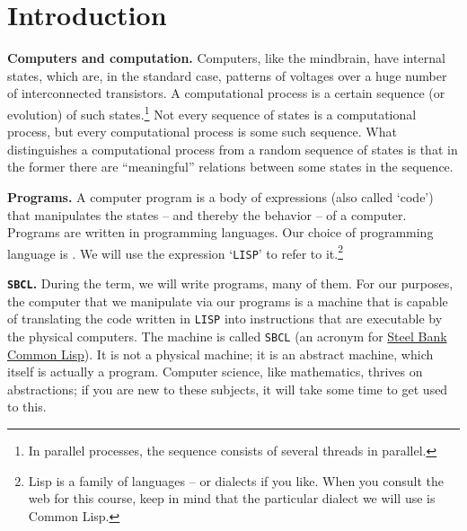 \documentclass[a4paper,11pt]{article}
\begin{document}

\section{Introduction}

\begin{uenum}
\item
{\bf Computers and computation.}
 Computers, like the mindbrain, have internal states, which are, in the standard case, patterns of voltages over a huge number of interconnected transistors. A computational process is a certain sequence (or evolution) of such states.\footnote{In parallel processes, the sequence consists of several threads in parallel.} Not every sequence of states is a computational process, but every computational process is some such sequence. What distinguishes a computational process from a random sequence of states is that in the former there are ``meaningful'' relations between some states in the sequence.

\item
{\bf Programs.} A computer program is a body of expressions (also called `code') that manipulates the states -- and thereby the behavior -- of a computer. Programs are written in programming languages. Our choice of programming language is . We will use the expression `\Verb+LISP+' to refer to it.\footnote{Lisp is a family of languages -- or dialects if you like. When you consult the web for this course, keep in mind that the particular dialect we will use is Common Lisp.}

\item {\bf \Verb+SBCL+.} During the term, we will write programs, many of them. For our purposes, the computer that we manipulate via our programs is a machine that is capable of translating the code written in \Verb+LISP+ into instructions that are executable by the physical computers. The machine is called \Verb+SBCL+ (an acronym for \href{http://www.sbcl.org/}{Steel Bank Common Lisp}). It is not a physical machine; it is an abstract machine, which itself is actually a program. Computer science, like mathematics, thrives on abstractions; if you are new to these subjects, it will take some time to get used to this.%


\end{uenum}
\end{document}
